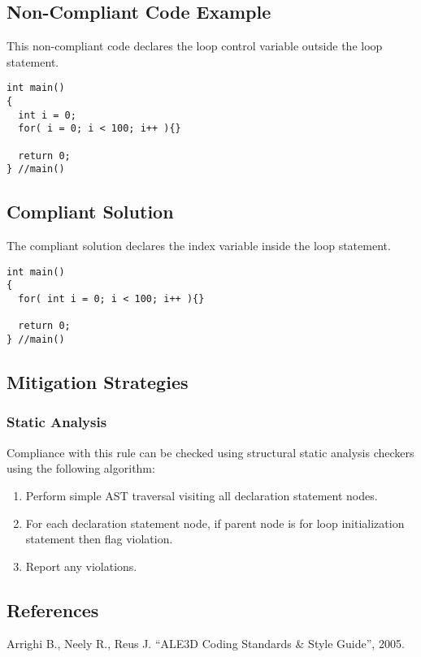 \subsection{Non-Compliant Code Example}
This non-compliant code declares the loop control variable outside the loop statement.

\begin{verbatim}
int main()
{
  int i = 0;
  for( i = 0; i < 100; i++ ){}

  return 0;
} //main()
\end{verbatim}

\subsection{Compliant Solution}
The compliant solution declares the index variable inside the loop statement.

\begin{verbatim}
int main()
{
  for( int i = 0; i < 100; i++ ){}

  return 0;
} //main()
\end{verbatim}

\subsection{Mitigation Strategies}
\subsubsection{Static Analysis} 

Compliance with this rule can be checked using structural static analysis checkers using the following algorithm:

\begin{enumerate}
\item Perform simple AST traversal visiting all declaration statement nodes.
\item For each declaration statement node, if parent node is for loop initialization statement then flag violation.
\item Report any violations. 
\end{enumerate}

\subsection{References}
Arrighi B., Neely R., Reus J. ``ALE3D Coding Standards \& Style Guide'', 2005.
